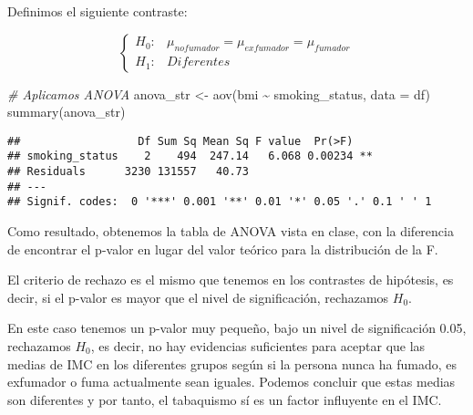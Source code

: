 \documentclass[
]{article}
\newenvironment{Shaded}{\begin{snugshade}}{\end{snugshade}}
\newcommand{\AttributeTok}[1]{\textcolor[rgb]{0.77,0.63,0.00}{#1}}
\newcommand{\CommentTok}[1]{\textcolor[rgb]{0.56,0.35,0.01}{\textit{#1}}}
\newcommand{\FunctionTok}[1]{\textcolor[rgb]{0.00,0.00,0.00}{#1}}
\newcommand{\NormalTok}[1]{#1}
\newcommand{\OtherTok}[1]{\textcolor[rgb]{0.56,0.35,0.01}{#1}}
\newcommand{\SpecialCharTok}[1]{\textcolor[rgb]{0.00,0.00,0.00}{#1}}
\begin{document}
Definimos el siguiente contraste:

\[ \left\{ \begin{array}{lc}
             H_{0}: & \mu_{no fumador} = \mu_{exfumador} = \mu_{fumador}\\
             H_{1}: & Diferentes
             \end{array}
\right. \]

\begin{Shaded}
\begin{Highlighting}[]
\CommentTok{\# Aplicamos ANOVA}
\NormalTok{anova\_str }\OtherTok{\textless{}{-}} \FunctionTok{aov}\NormalTok{(bmi }\SpecialCharTok{\textasciitilde{}}\NormalTok{ smoking\_status, }\AttributeTok{data =}\NormalTok{ df)}
\FunctionTok{summary}\NormalTok{(anova\_str)}
\end{Highlighting}
\end{Shaded}

\begin{verbatim}
##                  Df Sum Sq Mean Sq F value  Pr(>F)   
## smoking_status    2    494  247.14   6.068 0.00234 **
## Residuals      3230 131557   40.73                   
## ---
## Signif. codes:  0 '***' 0.001 '**' 0.01 '*' 0.05 '.' 0.1 ' ' 1
\end{verbatim}

Como resultado, obtenemos la tabla de ANOVA vista en clase, con la
diferencia de encontrar el p-valor en lugar del valor teórico para la
distribución de la F.

El criterio de rechazo es el mismo que tenemos en los contrastes de
hipótesis, es decir, si el p-valor es mayor que el nivel de
significación, rechazamos \(H_{0}\).

En este caso tenemos un p-valor muy pequeño, bajo un nivel de
significación 0.05, rechazamos \(H_{0}\), es decir, no hay evidencias
suficientes para aceptar que las medias de IMC en los diferentes grupos
según si la persona nunca ha fumado, es exfumador o fuma actualmente
sean iguales. Podemos concluir que estas medias son diferentes y por
tanto, el tabaquismo sí es un factor influyente en el IMC.
\end{document}
